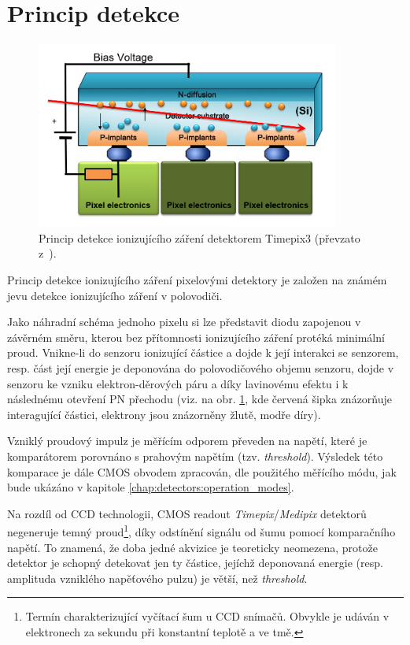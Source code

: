 \section{Princip detekce}
\begin{figure}[th]
	\begin{center}
		\includegraphics[width=10cm]{figures/det_recombination.png}
		\caption{Princip detekce ionizujícího záření detektorem Timepix3 (převzato z~\cite{PlatkevicDisertace}).}
		\label{fig:det:recombination}
	\end{center}
\end{figure}

Princip detekce ionizujícího záření pixelovými detektory je založen na známém jevu detekce ionizujícího záření v polovodiči. 

Jako náhradní schéma jednoho pixelu si lze představit diodu zapojenou v závěrném směru, kterou bez přítomnosti ionizujícího záření protéká minimální proud. Vnikne-li do senzoru ionizující částice a dojde k její interakci se senzorem, resp. část její energie je deponována do polovodičového objemu senzoru, dojde v senzoru ke vzniku elektron-děrových páru a díky lavinovému efektu i k následnému otevření PN přechodu (viz. na obr. \ref{fig:det:recombination}, kde červená šipka znázorňuje interagující částici, elektrony jsou znázorněny žlutě, modře díry).

Vzniklý proudový impulz je měřícím odporem převeden na napětí, které je komparátorem porovnáno s prahovým napětím (tzv. \textit{threshold}). Výsledek této komparace je dále CMOS obvodem zpracován, dle použitého měřícího módu, jak bude ukázáno v kapitole \ref{chap:detectors:operation_modes}.

Na rozdíl od CCD technologii, CMOS readout \textit{Timepix}/\textit{Medipix} detektorů negeneruje temný proud\footnote{Termín charakterizující vyčítací šum u CCD snímačů. Obvykle je udáván v elektronech za sekundu při konstantní teplotě a ve tmě.}, díky odstínění signálu od šumu pomocí komparačního napětí. To znamená, že doba jedné akvizice je teoreticky neomezena, protože detektor je schopný detekovat jen ty částice, jejíchž deponovaná energie (resp. amplituda vzniklého napěťového pulzu) je větší, než \textit{threshold}.

